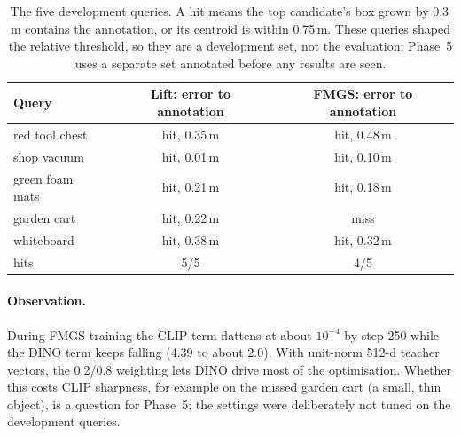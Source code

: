 \documentclass[11pt,a4paper]{article}
\begin{document}
\begin{table}[ht]
\centering\small
\begin{tabular}{@{}lcc@{}}
\toprule
Query & Lift: error to annotation & FMGS: error to annotation \\
\midrule
red tool chest   & hit, 0.35\,m & hit, 0.48\,m \\
shop vacuum      & hit, 0.01\,m & hit, 0.10\,m \\
green foam mats  & hit, 0.21\,m & hit, 0.18\,m \\
garden cart      & hit, 0.22\,m & miss \\
whiteboard       & hit, 0.38\,m & hit, 0.32\,m \\
\midrule
hits             & 5/5 & 4/5 \\
\bottomrule
\end{tabular}
\caption{The five development queries. A hit means the top candidate's box grown by 0.3\,m contains the annotation,
or its centroid is within 0.75\,m. These queries shaped the relative threshold, so they are a development set,
not the evaluation; Phase~5 uses a separate set annotated before any results are seen.}
\end{table}

\paragraph{Observation.} During FMGS training the CLIP term flattens at about $10^{-4}$ by step 250 while the DINO
term keeps falling (4.39 to about 2.0). With unit-norm 512-d teacher vectors, the 0.2/0.8 weighting lets DINO drive
most of the optimisation. Whether this costs CLIP sharpness, for example on the missed garden cart (a small, thin
object), is a question for Phase~5; the settings were deliberately not tuned on the development queries.

\end{document}
